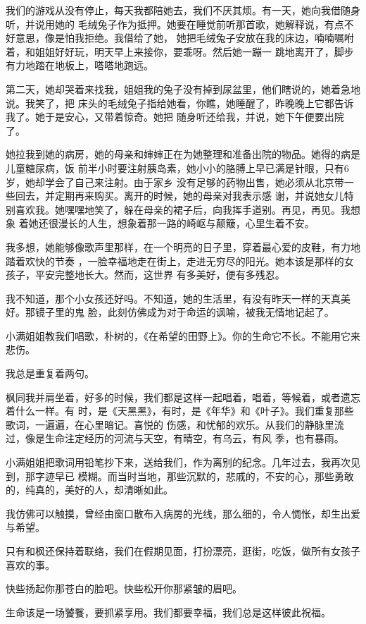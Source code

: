 \documentclass[12pt,a4paper]{article}
\begin{document}
		我们的游戏从没有停止，每天我都陪她去，我们不厌其烦。有一天，她向我借随身听，并说用她的
	毛绒兔子作为抵押。她要在睡觉前听那首歌，她解释说，有点不好意思，像是怕我拒绝。我借给了她，
	她把毛绒兔子安放在我的床边，喃喃嘱咐着，和姐姐好好玩，明天早上来接你，要乖呀。然后她一蹦一
	跳地离开了，脚步有力地踏在地板上，嗒嗒地跑远。

		第二天，她却哭着来找我，姐姐我的兔子没有掉到尿盆里，他们瞎说的，她着急地说。我笑了，把
	床头的毛绒兔子指给她看，你瞧，她睡醒了，昨晚晚上它都告诉我了。她于是安心，又带着惊奇。她把
	随身听还给我，并说，她下午便要出院了。


		她拉我到她的病房，她的母亲和婶婶正在为她整理和准备出院的物品。她得的病是儿童糖尿病，饭
	前半小时要注射胰岛素，她小小的胳膊上早已满是针眼，只有6岁，她却学会了自己来注射。由于家乡
	没有足够的药物出售，她必须从北京带一些回去，并定期再来购买。离开的时候，她的母亲对我表示感
	谢，并说她女儿特别喜欢我。她嘿嘿地笑了，躲在母亲的裙子后，向我挥手道别。再见，再见。我想象
	着她还很漫长的人生，想象着那一路的崎岖与颠簸，心里生着不安。


		我多想，她能够像歌声里那样，在一个明亮的日子里，穿着最心爱的皮鞋，有力地踏着欢快的节奏
	，一脸幸福地走在街上，走进无穷尽的阳光。她本该是那样的女孩子，平安完整地长大。然而，这世界
	有多美好，便有多残忍。


		我不知道，那个小女孩还好吗。不知道，她的生活里，有没有昨天一样的天真美好。那镜子里的鬼
	脸，此刻仿佛成为对于命运的讽喻，被我无情地记起了。


		小满姐姐教我们唱歌，朴树的，《在希望的田野上》。你的生命它不长。不能用它来悲伤。

		我总是重复着两句。

		枫同我并肩坐着，好多的时候，我们都是这样一起唱着，唱着，等候着，或者遗忘着什么一样。有
	时，是《天黑黑》，有时，是《年华》和《叶子》。我们重复那些歌词，一遍遍，在心里暗记。喜悦的
	伤感，和忧郁的欢乐。从我们的静脉里流过，像是生命注定经历的河流与天空，有晴空，有乌云，有风
	季，也有暴雨。

		小满姐姐把歌词用铅笔抄下来，送给我们，作为离别的纪念。几年过去，我再次见到，那字迹早已
	模糊。而当时当地，那些沉默的，悲戚的，不安的心，那些勇敢的，纯真的，美好的人，却清晰如此。


		我仿佛可以触摸，曾经由窗口散布入病房的光线，那么细的，令人惆怅，却生出爱与希望。


		只有和枫还保持着联络，我们在假期见面，打扮漂亮，逛街，吃饭，做所有女孩子喜欢的事。\par
		快些扬起你那苍白的脸吧。快些松开你那紧皱的眉吧。\par
		生命该是一场饕餮，要抓紧享用。我们都要幸福，我们总是这样彼此祝福。
\end{document}
